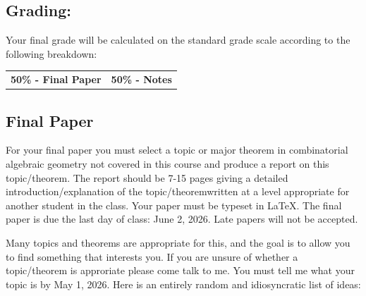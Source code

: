 \documentclass[11pt,letterpaper]{article}
\begin{document}
\subsection*{Grading:}

Your final grade will be calculated on the standard grade scale according to the following breakdown:

\vspace{2pt}\begingroup\setlength{\fboxsep}{8pt}
\colorbox{Pale}{\begin{minipage}{\dimexpr\linewidth-16pt\relax}
\begin{tabularx}{\linewidth}{@{}XX@{}}
{\sffamily\bfseries\color{Forest}50\% - Final Paper} & {\sffamily\bfseries\color{Forest}50\% - Notes}
\end{tabularx}\end{minipage}}\endgroup\vspace{3pt}

\subsection*{Final Paper}

For your final paper you must select a topic or major theorem in combinatorial algebraic geometry not covered in this course and produce a report on this topic/theorem. The report should be 7-15 pages giving a detailed introduction/explanation of the topic/theoremwritten at a level appropriate for another student in the class. Your paper must be typeset in LaTeX. The final paper is due the last day of class: June 2, 2026. Late papers will not be accepted.

Many topics and theorems are appropriate for this, and the goal is to allow you to find something that interests you. If you are unsure of whether a topic/theorem is approriate please come talk to me. You must tell me what your topic is by May 1, 2026. Here is an entirely random and idiosyncratic list of ideas:
\end{document}
